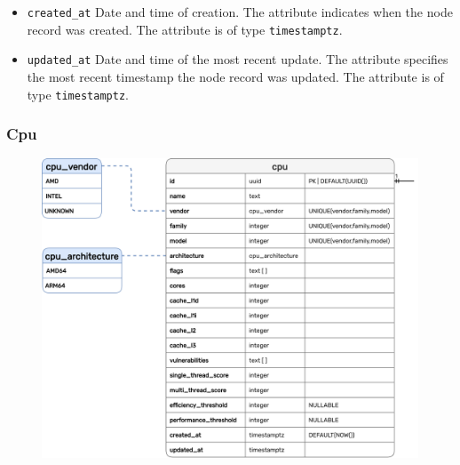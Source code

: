 \begin{itemize}
  \item \texttt{created\_at}
    \newline
    Date and time of creation.
    \newline
    The attribute indicates when the node record was created.
    \newline
    The attribute is of type \texttt{timestamptz}.

  \item \texttt{updated\_at}
    \newline
    Date and time of the most recent update.
    \newline
    The attribute specifies the most recent timestamp the node record was updated.
    \newline
    The attribute is of type \texttt{timestamptz}.
\end{itemize}

\pagebreak


\subsubsection{Cpu}
\label{subsubsec:implementation_server_database_cpu}

\begin{figure}
  \centering
  \includegraphics[width=\linewidth]{images/implementation/erm_cpu.png}
\end{figure}


